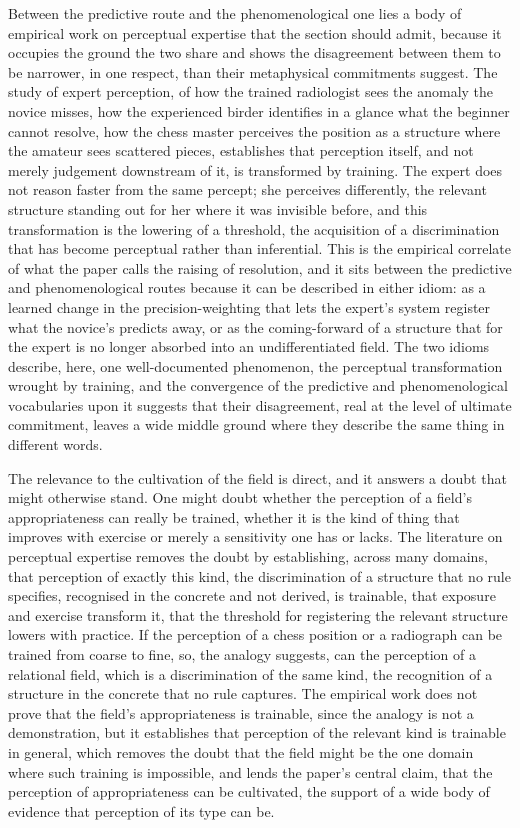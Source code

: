 Between the predictive route and the phenomenological one lies a body of empirical work on perceptual expertise that the section should admit, because it occupies the ground the two share and shows the disagreement between them to be narrower, in one respect, than their metaphysical commitments suggest. The study of expert perception, of how the trained radiologist sees the anomaly the novice misses, how the experienced birder identifies in a glance what the beginner cannot resolve, how the chess master perceives the position as a structure where the amateur sees scattered pieces, establishes that perception itself, and not merely judgement downstream of it, is transformed by training. The expert does not reason faster from the same percept; she perceives differently, the relevant structure standing out for her where it was invisible before, and this transformation is the lowering of a threshold, the acquisition of a discrimination that has become perceptual rather than inferential. This is the empirical correlate of what the paper calls the raising of resolution, and it sits between the predictive and phenomenological routes because it can be described in either idiom: as a learned change in the precision-weighting that lets the expert's system register what the novice's predicts away, or as the coming-forward of a structure that for the expert is no longer absorbed into an undifferentiated field. The two idioms describe, here, one well-documented phenomenon, the perceptual transformation wrought by training, and the convergence of the predictive and phenomenological vocabularies upon it suggests that their disagreement, real at the level of ultimate commitment, leaves a wide middle ground where they describe the same thing in different words.

The relevance to the cultivation of the field is direct, and it answers a doubt that might otherwise stand. One might doubt whether the perception of a field's appropriateness can really be trained, whether it is the kind of thing that improves with exercise or merely a sensitivity one has or lacks. The literature on perceptual expertise removes the doubt by establishing, across many domains, that perception of exactly this kind, the discrimination of a structure that no rule specifies, recognised in the concrete and not derived, is trainable, that exposure and exercise transform it, that the threshold for registering the relevant structure lowers with practice. If the perception of a chess position or a radiograph can be trained from coarse to fine, so, the analogy suggests, can the perception of a relational field, which is a discrimination of the same kind, the recognition of a structure in the concrete that no rule captures. The empirical work does not prove that the field's appropriateness is trainable, since the analogy is not a demonstration, but it establishes that perception of the relevant kind is trainable in general, which removes the doubt that the field might be the one domain where such training is impossible, and lends the paper's central claim, that the perception of appropriateness can be cultivated, the support of a wide body of evidence that perception of its type can be.

